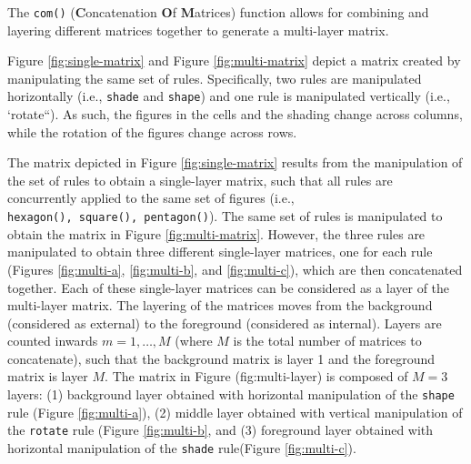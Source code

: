 The \texttt{com()} (\textbf{C}oncatenation \textbf{O}f \textbf{M}atrices) function allows for combining and layering different matrices together to generate a multi-layer matrix.

Figure \ref{fig:single-matrix} and Figure \ref{fig:multi-matrix} depict a matrix created by manipulating the same set of rules.
Specifically, two rules are manipulated horizontally (i.e., \texttt{shade} and \texttt{shape}) and one rule is manipulated vertically (i.e., `rotate``).
As such, the figures in the cells and the shading change across columns, while the rotation of the figures change across rows.



The matrix depicted in Figure \ref{fig:single-matrix} results from the manipulation of the set of rules to obtain a single-layer matrix, such that all rules are concurrently applied to the same set of figures (i.e., \texttt{hexagon(),\ square(),\ pentagon()}).
The same set of rules is manipulated to obtain the matrix in Figure \ref{fig:multi-matrix}.
However, the three rules are manipulated to obtain three different single-layer matrices, one for each rule (Figures \ref{fig:multi-a}, \ref{fig:multi-b}, and \ref{fig:multi-c}), which are then concatenated together.
Each of these single-layer matrices can be considered as a layer of the multi-layer matrix.
The layering of the matrices moves from the background (considered as external) to the foreground (considered as internal).
Layers are counted inwards \(m = 1, \ldots, M\) (where \(M\) is the total number of matrices to concatenate), such that the background matrix is layer 1 and the foreground matrix is layer \(M\).
The matrix in Figure (fig:multi-layer) is composed of \(M = 3\) layers: (1) background layer obtained with horizontal manipulation of the \texttt{shape} rule (Figure \ref{fig:multi-a}), (2) middle layer obtained with vertical manipulation of the \texttt{rotate} rule (Figure \ref{fig:multi-b}, and (3) foreground layer obtained with horizontal manipulation of the \texttt{shade} rule(Figure \ref{fig:multi-c}).


